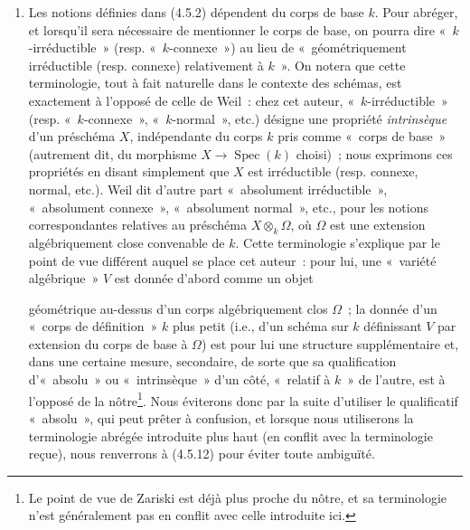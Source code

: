 \begin{remark}[4.5.12]
\label{IV.2.4.5.12-fr}
\begin{enumerate}
\item[(i)] Les notions définies dans (4.5.2) dépendent du corps de base $k$.
Pour abréger, et lorsqu'il sera nécessaire de mentionner le corps de base, on
pourra dire «~$k$-irréductible~» (resp. «~$k$-connexe~») au lieu de
«~géométriquement irréductible (resp. connexe) relativement à $k$~». On notera
que cette terminologie, tout à fait naturelle dans le contexte des schémas,
est exactement à l'opposé de celle de Weil~: chez cet auteur,
«~$k$-irréductible~» (resp. «~$k$-connexe~», «~$k$-normal~», etc.) désigne une
propriété \emph{intrinsèque} d'un préschéma $X$, indépendante du corps $k$ pris
comme «~corps de base~» (autrement dit, du morphisme
$X\to\operatorname{Spec}(k)$ choisi)~; nous exprimons ces propriétés en disant
simplement que $X$ est irréductible (resp. connexe, normal, etc.). Weil dit
d'autre part «~absolument irréductible~», «~absolument connexe~», «~absolument
normal~», etc., pour les notions correspondantes relatives au préschéma
$X\otimes_k\Omega$, où $\Omega$ est une extension algébriquement close
convenable de $k$. Cette terminologie s'explique par le point de vue différent
auquel se place cet auteur~: pour lui, une «~variété algébrique~» $V$ est
donnée d'abord comme un objet


géométrique au-dessus d'un corps algébriquement clos $\Omega$~; la donnée d'un
«~corps de définition~» $k$ plus petit (i.e., d'un schéma sur $k$ définissant
$V$ par extension du corps de base à $\Omega$) est pour lui une structure
supplémentaire et, dans une certaine mesure, secondaire, de sorte que sa
qualification d'«~absolu~» ou «~intrinsèque~» d'un côté, «~relatif à $k$~» de
l'autre, est à l'opposé de la nôtre\footnote{Le point de vue de Zariski est
déjà plus proche du nôtre, et sa terminologie n'est généralement pas en conflit
avec celle introduite ici.}. Nous éviterons donc par la suite d'utiliser le
qualificatif «~absolu~», qui peut prêter à confusion, et lorsque nous
utiliserons la terminologie abrégée introduite plus haut (en conflit avec la
terminologie reçue), nous renverrons à (4.5.12) pour éviter toute ambiguïté.


\end{enumerate}
\end{remark}

